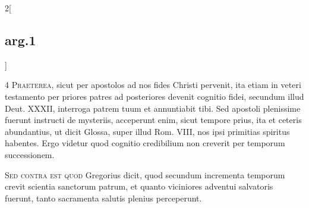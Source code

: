 \documentclass[paper=a4paper,fontsize=10pt,jafontsize=9pt,titlepage]{jlreq}
\begin{document}
\begin{paracol}{2}[\subsection{arg.1}]

{\scshape 4 Praeterea}, sicut per apostolos ad nos
fides Christi pervenit, ita etiam in veteri testamento per priores
patres ad posteriores devenit cognitio fidei, secundum illud
Deut. XXXII, interroga patrem tuum et annuntiabit tibi. Sed apostoli
plenissime fuerunt instructi de mysteriis, acceperunt enim, sicut
tempore prius, ita et ceteris abundantius, ut dicit Glossa, super illud
Rom. VIII, nos ipsi primitias spiritus habentes. Ergo videtur quod
cognitio credibilium non creverit per temporum successionem.

\switchcolumn



\switchcolumn*[\subsection{s.c.}]

{\scshape  Sed contra est quod} Gregorius dicit,
quod secundum incrementa temporum crevit scientia sanctorum patrum, et
quanto viciniores adventui salvatoris fuerunt, tanto sacramenta salutis
plenius perceperunt.

\switchcolumn





\end{paracol}
\end{document}
